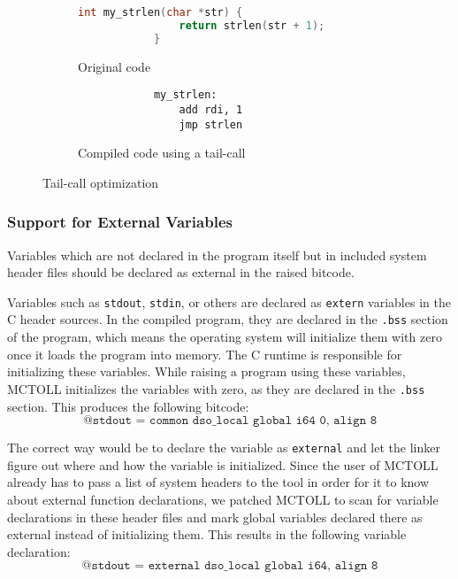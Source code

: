\begin{figure}[htpb]
    \centering
    \begin{subfigure}[t]{.45\textwidth}
        \begin{lstlisting}[language=C]
            int my_strlen(char *str) {
                return strlen(str + 1);
            }
        \end{lstlisting}
        \caption{Original code}
    \end{subfigure}
    \begin{subfigure}[t]{.45\textwidth}
        \begin{lstlisting}
            my_strlen:
                add rdi, 1
                jmp strlen
        \end{lstlisting}
        \caption{Compiled code using a tail-call}
    \end{subfigure}
    \caption{Tail-call optimization}
    \label{fig:tail-call-optimization}
\end{figure}

\subsubsection{Support for External Variables}

Variables which are not declared in the program itself but in included system header files should be declared as external in the raised bitcode.

Variables such as \texttt{stdout}, \texttt{stdin}, or others are declared as \texttt{extern} variables in the C header sources.
In the compiled program, they are declared in the \texttt{.bss} section of the program, which means the operating system will initialize them with zero once it loads the program into memory.
The C runtime is responsible for initializing these variables.
While raising a program using these variables, MCTOLL initializes the variables with zero, as they are declared in the \texttt{.bss} section.
This produces the following bitcode:
\[ \texttt{@stdout = common dso\_local global i64 0, align 8} \]

The correct way would be to declare the variable as \texttt{external} and let the linker figure out where and how the variable is initialized.
Since the user of MCTOLL already has to pass a list of system headers to the tool in order for it to know about external function declarations, we patched MCTOLL to scan for variable declarations in these header files and mark global variables declared there as external instead of initializing them.
This results in the following variable declaration:
\[ \texttt{@stdout = external dso\_local global i64, align 8} \]


